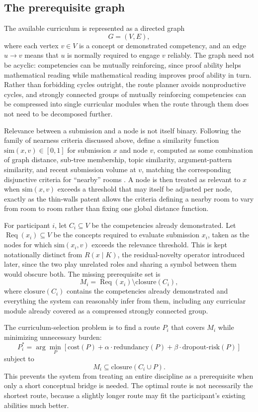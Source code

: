\documentclass[11pt]{article}
\begin{document}
\subsection{The prerequisite graph}

The available curriculum is represented as a directed graph
\[
G = (V, E),
\]
where each vertex $v \in V$ is a concept or demonstrated competency, and an edge $u \to v$ means that $u$ is normally required to engage $v$ reliably. The graph need not be acyclic: competencies can be mutually reinforcing, since proof ability helps mathematical reading while mathematical reading improves proof ability in turn. Rather than forbidding cycles outright, the route planner avoids nonproductive cycles, and strongly connected groups of mutually reinforcing competencies can be compressed into single curricular modules when the route through them does not need to be decomposed further.

Relevance between a submission and a node is not itself binary. Following the family of nearness criteria discussed above, define a similarity function $\mathrm{sim}(x, v) \in [0,1]$ for submission $x$ and node $v$, computed as some combination of graph distance, sub-tree membership, topic similarity, argument-pattern similarity, and recent submission volume at $v$, matching the corresponding disjunctive criteria for ``nearby'' rooms \cite{anderson2011thinwalls}. A node is then treated as relevant to $x$ when $\mathrm{sim}(x, v)$ exceeds a threshold that may itself be adjusted per node, exactly as the thin-walls patent allows the criteria defining a nearby room to vary from room to room rather than fixing one global distance function.

For participant $i$, let $C_i \subseteq V$ be the competencies already demonstrated. Let $\operatorname{Req}(x_i) \subseteq V$ be the concepts required to evaluate submission $x_i$, taken as the nodes for which $\mathrm{sim}(x_i, v)$ exceeds the relevance threshold. This is kept notationally distinct from $R(x \mid K)$, the residual-novelty operator introduced later, since the two play unrelated roles and sharing a symbol between them would obscure both. The missing prerequisite set is
\[
M_i = \operatorname{Req}(x_i) \setminus \mathrm{closure}(C_i),
\]
where $\mathrm{closure}(C_i)$ contains the competencies already demonstrated and everything the system can reasonably infer from them, including any curricular module already covered as a compressed strongly connected group.

The curriculum-selection problem is to find a route $P_i$ that covers $M_i$ while minimizing unnecessary burden:
\[
P_i^{*} = \arg\min_{P} \left[ \mathrm{cost}(P) + \alpha \cdot \mathrm{redundancy}(P) + \beta \cdot \mathrm{dropout\text{-}risk}(P) \right]
\]
subject to
\[
M_i \subseteq \mathrm{closure}(C_i \cup P).
\]
This prevents the system from treating an entire discipline as a prerequisite when only a short conceptual bridge is needed. The optimal route is not necessarily the shortest route, because a slightly longer route may fit the participant's existing abilities much better.
\end{document}

